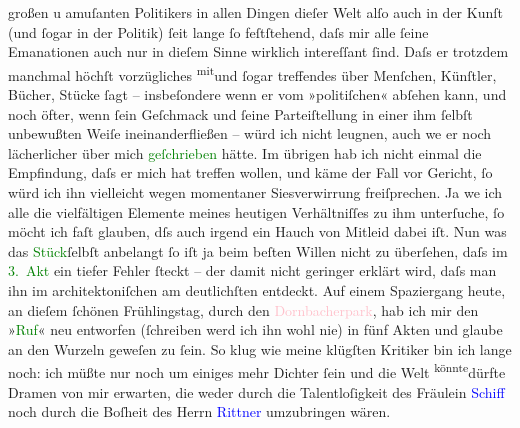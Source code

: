                großen u amuſanten Politikers in allen Dingen dieſer Welt alſo auch in der Kunſt (und
               ſogar in der Politik) ſeit lange ſo feſtſtehend, {\pb}daſs
               mir alle ſeine Emanationen auch nur in dieſem Sinne wirklich intereſſant ſind. Daſs
               er trotzdem manchmal höchſt vorzügliches \substVorne{}\textsuperscript{mit}\substDazwischen{}und\substHinten{}{ } ſogar treffendes über Menſchen, Künſtler,
               Bücher, Stücke ſagt – insbeſondere wenn er vom »politiſchen« abſehen kann, und noch
               öfter, wenn ſein Geſchmack und ſeine Parteiſtellung in einer ihm ſelbſt unbewußten
               Weiſe ineinanderfließen – würd ich nicht leugnen, auch we{\geminationn} er noch lächerlicher über mich \textcolor{green}{geſchrie{\pb}ben}{} hätte. Im übrigen hab ich nicht
               einmal die Empfindung, daſs er mich hat treffen wollen, und käme der Fall vor
               Gericht, ſo würd ich ihn vielleicht wegen momentaner Si{\geminationn}esverwirrung freiſprechen. Ja we{\geminationn} ich alle die
               vielfältigen Elemente meines heutigen Verhältniſſes zu ihm unterſuche, ſo möcht ich
               faſt glauben, dſs auch irgend ein Hauch von Mitleid dabei iſt.\pend
           \pstart
           Nun was das \textcolor{green}{Stück}{}ſelbſt anbelangt ſo iſt ja beim beſten Willen nicht
               zu überſehen, daſs im \textcolor{green}{3. Akt}{} ein
                  {\pb}tiefer Fehler ſteckt – der damit nicht geringer
               erklärt wird, daſs man ihn \introOben{}im\introOben{} architektoniſchen am
               deutlichſten entdeckt. Auf einem Spaziergang heute, an dieſem ſchönen Frühlingstag,
               durch den \textcolor{pink}{Dornbacherpark}{}\ledrightnote{\textcolor{pink}{Dornbacher Park}}, hab ich mir den »\textcolor{green}{Ruf}{}\ledrightnote{\textcolor{green}{Der Ruf des Lebens. Schauspiel in drei Akten}}« neu entworfen (ſchreiben werd ich ihn wohl nie)
               in fünf Akten und glaube an den Wurzeln geweſen zu ſein. So klug wie meine klügſten
               Kritiker bin ich lange noch: ich müßte {\pb}nur noch um
               einiges mehr Dichter ſein und die Welt \substVorne{}\textsuperscript{könnte}{\allowbreak}\substDazwischen{}dürfte\substHinten{} Dramen von mir erwarten, die weder durch die Talentloſigkeit des Fräulein
                  \textcolor{blue}{Schiff}{}\ledrightnote{\textcolor{blue}{Else Bassermann}} noch durch die Boſheit des Herrn \textcolor{blue}{Rittner}{}\ledrightnote{\textcolor{blue}{Rudolf Rittner}} umzubringen wären.\pend
